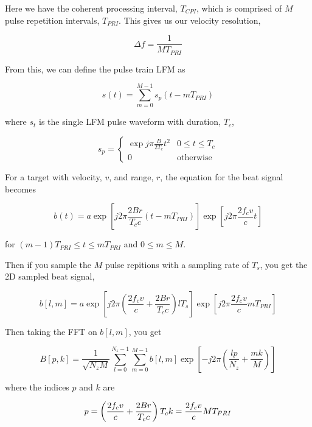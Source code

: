 \documentclass[preview]{standalone}
\begin{document}
\begin{center}
Here we have the coherent processing interval, $T_{CPI}$, which is comprised of $M$ pulse repetition intervals, $T_{PRI}$. This gives us our velocity resolution, 

\begin{equation}
    \Delta f = \frac{1}{M T_{PRI}}
\end{equation}

From this, we can define the pulse train LFM as

\begin{equation}
    s(t) = \sum_{m=0}^{M-1} s_p(t - m T_{PRI})
\end{equation}

where $s_t$ is the single LFM pulse waveform with duration, $T_c$,

\begin{equation}
    s_p = \begin{cases} 
      \exp{j \pi \frac{B}{2 T_c} t^2} & 0 \le t \le T_c \\
      0 & \text{otherwise}
   \end{cases}
\end{equation}

For a target with velocity, $v$, and range, $r$, the equation for the beat signal becomes

\begin{equation}
    b(t) = a \exp{\left[ j 2 \pi \frac{2 B r}{T_c c} (t - m T_{PRI}) \right]} \exp{\left[ j 2 \pi \frac{2 f_c v}{c} t \right]}
\end{equation}

for $(m-1) T_{PRI} \le t \le m T_{PRI}$ and $0 \le m \le M$.

Then if you sample the $M$ pulse repitions with a sampling rate of $T_s$, you get the 2D sampled beat signal,

\begin{equation}
    b[l, m] = a \exp{\left[ j 2 \pi \left( \frac{2 f_c v}{c} + \frac{2 B r}{T_c c} \right) l T_s \right]} \exp{\left[ j 2 \pi \frac{2 f_c v}{c} m T_{PRI} \right]}
\end{equation}

Then taking the FFT on $b[l, m]$, you get

\begin{equation}
    B[p, k] = \frac{1}{\sqrt{N_z M}} \sum_{l=0}^{N_z-1} \sum_{m=0}^{M-1} b[l, m] \exp{\left[ -j 2 \pi \left( \frac{lp}{N_z} + \frac{mk}{M} \right) \right]}
\end{equation}

where the indices $p$ and $k$ are

\begin{equation}
    p = \left( \frac{2 f_c v}{c} + \frac{2 B r}{T_c c} \right)T_c \\
    k = \frac{2 f_c v}{c} M T_{PRI}
\end{equation}
\end{center}
\end{document}
